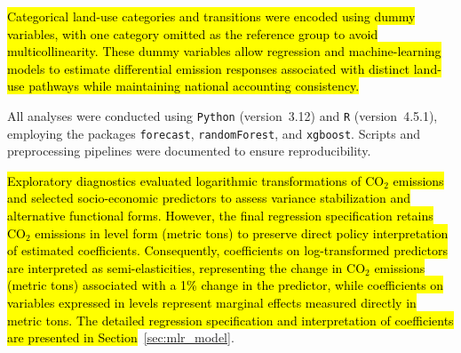 \documentclass[10pt,letterpaper]{article}
\begin{document}
\hl{Categorical land-use categories and transitions were encoded using dummy variables, with one category omitted as the reference group to avoid multicollinearity. These dummy variables allow regression and machine-learning models to estimate differential emission responses associated with distinct land-use pathways while maintaining national accounting consistency.}

All analyses were conducted using \texttt{Python} (version~3.12) and \texttt{R} (version~4.5.1), employing the packages \texttt{forecast}, \texttt{randomForest}, and \texttt{xgboost}. Scripts and preprocessing pipelines were documented to ensure reproducibility.

\hl{Exploratory diagnostics evaluated logarithmic transformations of CO$_2$ emissions and selected socio-economic predictors to assess variance stabilization and alternative functional forms. However, the final regression specification retains CO$_2$ emissions in level form (metric tons) to preserve direct policy interpretation of estimated coefficients. Consequently, coefficients on log-transformed predictors are interpreted as semi-elasticities, representing the change in CO$_2$ emissions (metric tons) associated with a 1\% change in the predictor, while coefficients on variables expressed in levels represent marginal effects measured directly in metric tons. The detailed regression specification and interpretation of coefficients are presented in Section}~\ref{sec:mlr_model}.

\end{document}
